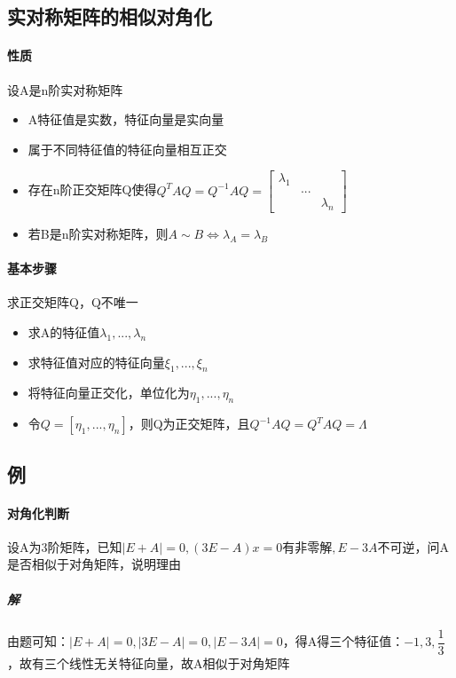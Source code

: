 \subsection{实对称矩阵的相似对角化}

\paragraph{性质}
设A是n阶实对称矩阵
\begin{itemize}
    \item A特征值是实数，特征向量是实向量
    \item 属于不同特征值的特征向量相互正交
    \item 存在n阶正交矩阵Q使得\(Q^TAQ = Q^{-1}AQ = \begin{bmatrix}
        \lambda_1 & & \\ 
        & ... & \\ 
        & & \lambda_n
    \end{bmatrix}\)
    \item 若B是n阶实对称矩阵，则\(A \sim B \Leftrightarrow \lambda_A = \lambda_B\)
\end{itemize}

\paragraph{基本步骤}
求正交矩阵Q，Q不唯一
\begin{itemize}
    \item 求A的特征值\(\lambda_1, ..., \lambda_n\)
    \item 求特征值对应的特征向量\(\xi_1, ..., \xi_n\)
    \item 将特征向量正交化，单位化为\(\eta_1, ..., \eta_n\)
    \item 令\(Q = [\eta_1, ..., \eta_n]\)，则Q为正交矩阵，且\(Q^{-1}AQ = Q^TAQ = \Lambda\)
\end{itemize}



\subsection{例}

\paragraph{对角化判断}
设A为3阶矩阵，已知\(|E + A| = 0, (3E - A)x = 0\text{有非零解}, E - 3A\)不可逆，问A是否相似于对角矩阵，说明理由
\subparagraph{解}
由题可知：\(|E + A| = 0, |3E - A| = 0, |E - 3A| = 0\)，得A得三个特征值：\(-1, 3, \dfrac{1}{3}\)，故有三个线性无关特征向量，故A相似于对角矩阵

